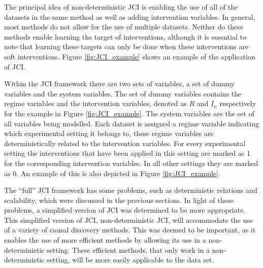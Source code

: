 \documentclass[a4paper,pdf]{article}
\newcommand{\Sara}[1]{{\color{blue} Sara: #1}}
\begin{document}


The principal idea of non-deterministic JCI is enabling the use of all of the datasets in the same method as well as adding intervention variables. In general, most methods do not allow for the use of multiple datasets. Neither do these methods enable learning the target of interventions, although it is essential to note that learning these targets can only be done when these interventions are soft interventions. Figure \ref{fig:JCI_example} shows an example of the application of JCI. 

Within the JCI framework there are two sets of variables, a set of dummy variables and the system variables. The set of dummy variables contains the regime variables and the intervention variables, denoted as $R$ and $I_n$ respectively for the example in Figure \ref{fig:JCI_example}. The system variables are the set of all variables being modelled. Each dataset is assigned a regime variable indicating which experimental setting it belongs to, these regime variables are deterministically related to the intervention variables. For every experimental setting the interventions that have been applied in this setting are marked as 1 for the corresponding intervention variables. In all other settings they are marked as 0. An example of this is also depicted in Figure \ref{fig:JCI_example}.

The ``full'' JCI framework has some problems, such as deterministic relations and scalability, which were discussed in the previous sections. In light of these problems, a simplified version of JCI was determined to be more appropriate. This simplified version of JCI, non-deterministic JCI, will accommodate the use of a variety of causal discovery methods. This was deemed to be important, as it enables the use of more efficient methods by allowing its use in a non-deterministic setting. These efficient methods, that only work in a non-deterministic setting, will be more easily applicable to the data set.
\end{document}
